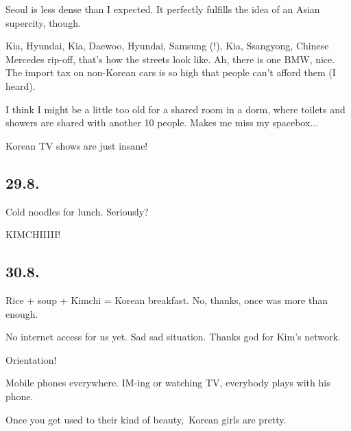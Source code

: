 \begin{post}
\begin{content}
\begin{itemize*}
	\item Seoul is less dense than I expected. It perfectly fulfills the idea of an Asian supercity, though.

	\item Kia, Hyundai, Kia, Daewoo, Hyundai, Samsung (!), Kia, Ssangyong, Chinese Mercedes rip-off, that's how the streets look like. Ah, there is one BMW, nice. The import tax on non-Korean cars is so high that people can't afford them (I heard).

	\item I think I might be a little too old for a shared room in a dorm, where toilets and showers are shared with another 10 people. Makes me miss my spacebox...

	\item Korean TV shows are just insane!

\end{itemize*}

\subsection{29.8.}

\begin{itemize*}

	\item Cold noodles for lunch. Seriously?

	\item KIMCHIIIII!

\end{itemize*}

\subsection{30.8.}



\begin{itemize*}

	\item Rice + soup + Kimchi = Korean breakfast. No, thanks, once was more than enough.

	\item No internet access for us yet. Sad sad situation. Thanks god for Kim's network.

	\item Orientation!

	\item Mobile phones everywhere. IM-ing or watching TV, everybody plays with his phone.

	\item Once you get used to their kind of beauty, Korean girls are pretty.


\end{itemize*}
\end{content}
\end{post}
